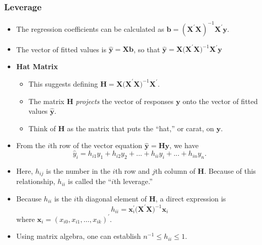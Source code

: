 \begin{frame}[shrink=2]
 \frametitle{Leverage}
 \begin{itemize}
   \item The regression coefficients can be calculated
   as $\mathbf{b} = (\mathbf{X}^{\prime}\mathbf{X})^{-1}
   \mathbf{X}^{\prime}\mathbf{y}$.
   \item The vector of fitted values is
   $\mathbf{\widehat{y}}=\mathbf{Xb}$, so that $\mathbf{\widehat{y}}= \mathbf{X(X}^{\prime
}\mathbf{X)}^{-1}\mathbf{X}^{\prime }\mathbf{y}$
 \item \textbf{Hat Matrix}
  \begin{itemize}
   \item This suggests defining $\mathbf{H}=\mathbf{X(X}^{\prime }\mathbf{X)}^{-1}%
\mathbf{X}^{\prime }$.
 \item The matrix $\mathbf{H}$ \textit{projects} the vector of responses
 $\mathbf{y}$ onto the vector of fitted values $\mathbf{\widehat{y}}$.
 \item Think of $\mathbf{H}$ as the matrix that puts
the ``hat,'' or carat, on $\mathbf{y}$.
   \end{itemize}
 \item From the $i$th row of the vector equation $\mathbf{\widehat{y}=Hy}$, we have
\begin{equation*}
\widehat{y}_{i}=h_{i1}y_{1}+h_{i2}y_{2}+...+h_{ii}y_{i}+...+h_{in}y_{n}.
\end{equation*}
 \item Here, $h_{ij}$ is the number in the $i$th row and $j$th column of
$\mathbf{H} $. Because of this relationship, $h_{ii}$ is called the
``$i$th leverage.''
 \item Because $h_{ii}$ is the $i$th diagonal element of $%
\mathbf{H}$, a direct expression is
\begin{equation*}
h_{ii}=\mathbf{x}_{i}^{\prime }\mathbf{(X}^{\prime }\mathbf{X)}^{-1}\mathbf{x%
}_{i}
\end{equation*}
where $\mathbf{x}_{i}=(x_{i0},x_{i1},\ldots,x_{ik})^{\prime }$.
 \item Using matrix algebra, one can establish $ n^{-1}\leq h_{ii}\leq 1.$
    \end{itemize}

\end{frame}

